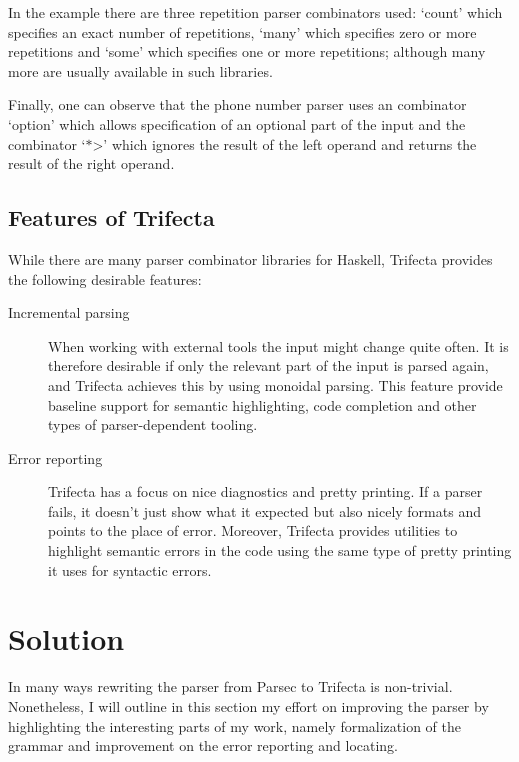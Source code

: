 \documentclass[a4paper]{article}%
\begin{document}
In the example there are three repetition parser combinators used: `count' which specifies an exact number of repetitions, `many' which specifies zero or more repetitions and `some' which specifies one or more repetitions;
although many more are usually available in such libraries.

Finally, one can observe that the phone number parser uses an combinator `option' which allows specification of an optional part of the input and the combinator `$\ast$>' which ignores the result of the left operand and returns
the result of the right operand.

\subsection{Features of Trifecta}
\label{sub:FeaturesofTrifecta}
While there are many parser combinator libraries for Haskell, Trifecta provides the following desirable features:
\begin{description}
  \item[Incremental parsing] When working with external tools the input might change quite often.
                             It is therefore desirable if only the relevant part of the input is parsed again, and Trifecta achieves this by using monoidal parsing\cite{kmett2009iteratorsparsecandmonoids}.
                             This feature provide baseline support for semantic highlighting, code completion and other types of parser-dependent tooling.
  \item[Error reporting] Trifecta has a focus on nice diagnostics and pretty printing. If a parser fails, it doesn't just show what it expected but also nicely formats and points to the place of error. 
                         Moreover, Trifecta provides utilities to highlight semantic errors in the code using the same type of pretty printing it uses for syntactic errors.
\end{description}

\section{Solution}
\label{sec:Solution}
In many ways rewriting the parser from Parsec to Trifecta is non-trivial.
Nonetheless, I will outline in this section my effort on improving the parser by highlighting the interesting parts of my work, namely formalization of the grammar and improvement on the error reporting and locating.
\end{document}
